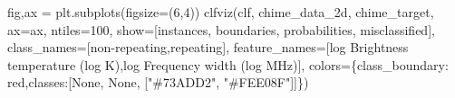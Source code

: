 \documentclass[
  letterpaper,
  DIV=11,
  numbers=noendperiod]{scrartcl}
\newenvironment{Shaded}{\begin{snugshade}}{\end{snugshade}}
\newcommand{\DecValTok}[1]{\textcolor[rgb]{0.68,0.00,0.00}{#1}}
\newcommand{\NormalTok}[1]{\textcolor[rgb]{0.00,0.23,0.31}{#1}}
\newcommand{\OperatorTok}[1]{\textcolor[rgb]{0.37,0.37,0.37}{#1}}
\newcommand{\StringTok}[1]{\textcolor[rgb]{0.13,0.47,0.30}{#1}}
\newcommand{\VariableTok}[1]{\textcolor[rgb]{0.07,0.07,0.07}{#1}}
\begin{document}
\begin{Shaded}
\begin{Highlighting}[]
\NormalTok{fig,ax }\OperatorTok{=}\NormalTok{ plt.subplots(figsize}\OperatorTok{=}\NormalTok{(}\DecValTok{6}\NormalTok{,}\DecValTok{4}\NormalTok{))}
\NormalTok{clfviz(clf, chime\_data\_2d, chime\_target, ax}\OperatorTok{=}\NormalTok{ax, ntiles}\OperatorTok{=}\DecValTok{100}\NormalTok{,}
\NormalTok{       show}\OperatorTok{=}\NormalTok{[}\StringTok{\textquotesingle{}instances\textquotesingle{}}\NormalTok{, }\StringTok{\textquotesingle{}boundaries\textquotesingle{}}\NormalTok{, }\StringTok{\textquotesingle{}probabilities\textquotesingle{}}\NormalTok{, }\StringTok{\textquotesingle{}misclassified\textquotesingle{}}\NormalTok{],}
\NormalTok{       class\_names}\OperatorTok{=}\NormalTok{[}\StringTok{\textquotesingle{}non{-}repeating\textquotesingle{}}\NormalTok{,}\StringTok{\textquotesingle{}repeating\textquotesingle{}}\NormalTok{],}
\NormalTok{       feature\_names}\OperatorTok{=}\NormalTok{[}\StringTok{\textquotesingle{}log Brightness temperature (log K)\textquotesingle{}}\NormalTok{,}\StringTok{\textquotesingle{}log Frequency width (log MHz)\textquotesingle{}}\NormalTok{],}
\NormalTok{       colors}\OperatorTok{=}\NormalTok{\{}\StringTok{\textquotesingle{}class\_boundary\textquotesingle{}}\NormalTok{: }\StringTok{\textquotesingle{}red\textquotesingle{}}\NormalTok{,}\StringTok{\textquotesingle{}classes\textquotesingle{}}\NormalTok{:[}\VariableTok{None}\NormalTok{,  }\VariableTok{None}\NormalTok{,  [}\StringTok{"\#73ADD2"}\NormalTok{, }\StringTok{"\#FEE08F"}\NormalTok{]]\})}


\end{Highlighting}
\end{Shaded}
\end{document}
